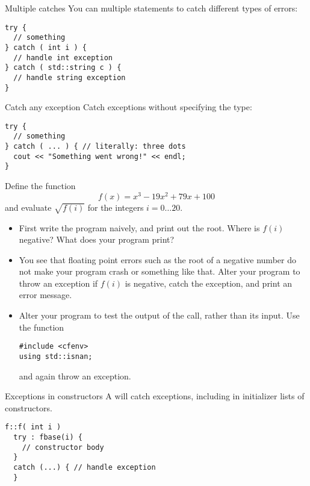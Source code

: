 \begin{block}{Multiple catches}
  \label{sl:exception-catches}
  You can multiple  statements to catch different types of
  errors:
\begin{lstlisting}
try {
  // something
} catch ( int i ) {
  // handle int exception
} catch ( std::string c ) {
  // handle string exception
}
\end{lstlisting}
\end{block}

\begin{block}{Catch any exception}
  \label{sl:exception-catchall}
  Catch exceptions without specifying the type:
\begin{lstlisting}
try {
  // something
} catch ( ... ) { // literally: three dots
  cout << "Something went wrong!" << endl;
}
\end{lstlisting}
\end{block}

\begin{exercise}
  \label{ex:throw-negroot}
  Define the function \[ f(x)=x^3-19x^2+79x+100 \] and evaluate
  $\sqrt{f(i)}$ for the integers $i=0\ldots20$.
  \begin{itemize}
  \item First write the program naively, and print out the root. Where is
    $f(i)$ negative? What does your program print?
  \item You see that floating point errors such as the root of a negative number
    do not make your program crash or
    something like that. Alter your program to throw an exception if
    $f(i)$ is negative, catch the exception, and print an error
    message.
  \item Alter your program to test the output of the  call,
    rather than its input.
    Use the function 
\begin{lstlisting}
#include <cfenv>
using std::isnan;  
\end{lstlisting}
    and again throw an exception.
  \end{itemize}
\end{exercise}

\begin{block}{Exceptions in constructors}
  \label{sl:except-construct}
  A  will catch exceptions,
    including in initializer lists of constructors.
\begin{lstlisting}
f::f( int i ) 
  try : fbase(i) {
    // constructor body
  }
  catch (...) { // handle exception
  }
\end{lstlisting}
\end{block}

